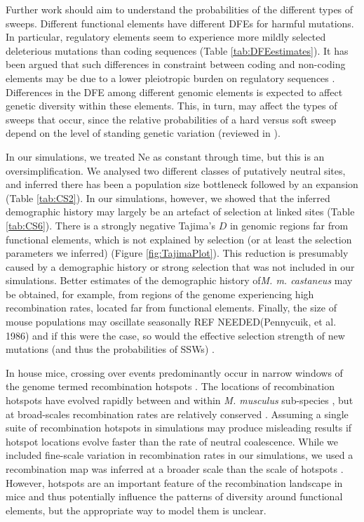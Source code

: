 	Further work should aim to understand the probabilities of the different types of sweeps. Different functional elements have different DFEs for harmful mutations. In particular, regulatory elements seem to experience more mildly selected deleterious mutations than coding sequences \citep{RN122, RN346} (Table \ref{tab:DFEestimates}). It has been argued that such differences in constraint between coding and non-coding elements may be due to a lower pleiotropic burden on regulatory sequences \citep{RN346}. Differences in the DFE among different genomic elements is expected to affect genetic diversity within these elements. This, in turn, may affect the types of sweeps that occur, since the relative probabilities of a hard versus soft sweep depend on the level of standing genetic variation (reviewed in \cite{RN336}). 

	In our simulations, we treated Ne as constant through time, but this is an oversimplification. We analysed two different classes of putatively neutral sites, and inferred there has been a population size bottleneck followed by an expansion (Table \ref{tab:CS2}). In our simulations, however, we showed that the inferred demographic history may largely be an artefact of selection at linked sites (Table \ref{tab:CS6}). There is a strongly negative Tajima’s $D$ in genomic regions far from functional elements, which is not explained by selection (or at least the selection parameters we inferred) (Figure \ref{fig:TajimaPlot}). This reduction is presumably caused by a demographic history or strong selection that was not included in our simulations. Better estimates of the demographic history of\textit{M. m. castaneus} may be obtained, for example, from regions of the genome experiencing high recombination rates, located far from functional elements. Finally, the size of mouse populations may oscillate seasonally REF NEEDED(Pennycuik, et al. 1986) and if this were the case, so would the effective selection strength of new mutations (and thus the probabilities of SSWs) \citep{RN350}. 

	In house mice, crossing over events predominantly occur in narrow windows of the genome termed recombination hotspots \cite{RN254}. The locations of recombination hotspots have evolved rapidly between and within \textit{M. musculus} sub-species \citep{RN249}, but at broad-scales recombination rates are relatively conserved \citep{RN340}. Assuming a single suite of recombination hotspots in simulations may produce misleading results if hotspot locations evolve faster than the rate of neutral coalescence. While we included fine-scale variation in recombination rates in our simulations, we used a recombination map was inferred at a broader scale than the scale of hotspots \citep{RN340}. However, hotspots are an important feature of the recombination landscape in mice and thus potentially influence the patterns of diversity around functional elements, but the appropriate way to model them is unclear.


